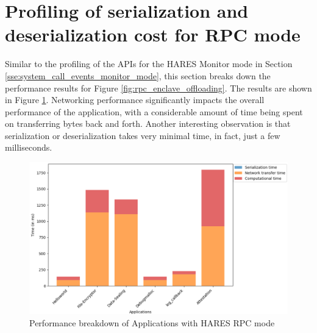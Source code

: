 \documentclass[article, doublespace,nopageskip]{VTthesis} %
\newcommand{\monitor}{HARES }
\begin{document}
    \section{Profiling of serialization and deserialization cost for RPC mode} \label{sse:Profiling of serialization and deserialization cost for RPC mode}
    Similar to the profiling of the APIs for the \monitor Monitor mode in Section \ref{sse:system_call_events_monitor_mode}, this section breaks down the performance results for Figure \ref{fig:rpc_enclave_offloading}. The results are shown in Figure \ref{fig:perf_breakdown_rpc}. Networking performance significantly impacts the overall performance of the application, with a considerable amount of time being spent on transferring bytes back and forth. Another interesting observation is that serialization or deserialization takes very minimal time, in fact, just a few milliseconds.

    \begin{figure}[htb]
        \centering
        \includegraphics[scale=0.6]{figures/perf_breakdown_rpc.png}
        \caption{Performance breakdown of Applications with \monitor RPC mode} 
        \label{fig:perf_breakdown_rpc}
    \end{figure}
    
\end{document}
